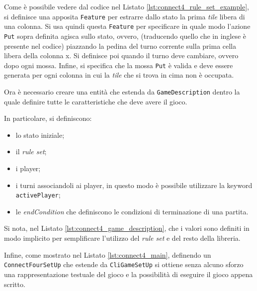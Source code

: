 

%
Come è possibile vedere dal codice nel Listato \ref{lst:connect4_rule_set_example}, si definisce una apposita \texttt{Feature} per estrarre dallo stato la prima \textit{tile} libera di una colonna.
%
Si usa quindi questa \texttt{Feature} per specificare in quale modo l'azione \texttt{Put} sopra definita agisca sullo stato, ovvero, (traducendo quello che in inglese è presente nel codice) piazzando la pedina del turno corrente sulla prima cella libera della colonna x.
%
Si definisce poi quando il turno deve cambiare, ovvero dopo ogni mossa.
%
Infine, si specifica che la mossa \texttt{Put} è valida e deve essere generata per ogni colonna in cui la \textit{tile} che si trova in cima non è occupata.

Ora è necessario creare una entità che estenda da \texttt{GameDescription} dentro la quale definire tutte le caratteristiche che deve avere il gioco.
%

%
In particolare, si definiscono:
\begin{itemize}
  \item lo stato iniziale;
  \item il \textit{rule set};
  \item i player;
  \item i turni associandoli ai player, in questo modo è possibile utilizzare la keyword \texttt{activePlayer};
  \item le \textit{endCondition} che definiscono le condizioni di terminazione di una partita.
\end{itemize}
%
Si nota, nel Listato \ref{lst:connect4_game_description}, che i valori sono definiti in modo implicito per semplificare l'utilizzo del \textit{rule set} e del resto della libreria.


%
Infine, come mostrato nel Listato \ref{lst:connect4_main}, definendo un \texttt{ConnectFourSetUp} che estende da \texttt{CliGameSetUp} si ottiene senza alcuno sforzo una rappresentazione testuale del gioco e la possibilità di eseguire il gioco appena scritto.


